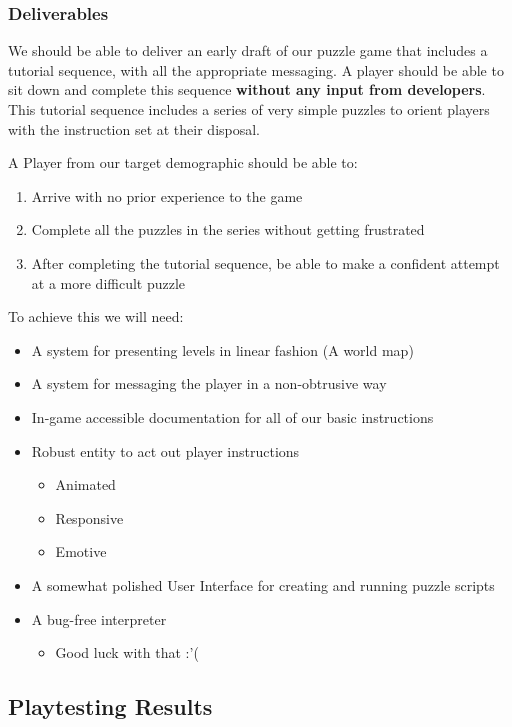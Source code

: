 \subsubsection*{Deliverables}
We should be able to deliver an early draft of our puzzle game that includes a
tutorial sequence, with all the appropriate messaging. A player should be able
to sit down and complete this sequence \textbf{without any input from developers}.
This tutorial sequence includes a series of very simple puzzles to orient
players with the instruction set at their disposal.

A Player from our target demographic should be able to:
\begin{enumerate}
  \item Arrive with no prior experience to the game
  \item Complete all the puzzles in the series without getting frustrated
  \item After completing the tutorial sequence, be able to make a confident
  attempt at a more difficult puzzle
\end{enumerate}

To achieve this we will need:
\begin{itemize}
  \item A system for presenting levels in linear fashion (A world map)
  \item A system for messaging the player in a non-obtrusive way
  \item In-game accessible documentation for all of our basic instructions
  \item Robust entity to act out player instructions
  \begin{itemize}
    \item Animated
    \item Responsive
    \item Emotive
  \end{itemize}
  \item A somewhat polished User Interface for creating and running puzzle scripts
  \item A bug-free interpreter
  \begin{itemize}
    \item Good luck with that :’(
  \end{itemize}
\end{itemize}

\subsection{Playtesting Results}
